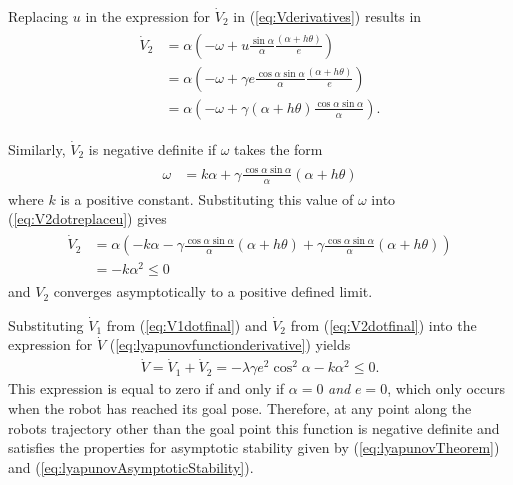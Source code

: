 Replacing $u$ in the expression for $\dot{V}_2$ in (\ref{eq:Vderivatives}) results in
\begin{align}
\label{eq:V2dotreplaceu}
\begin{split}
\dot{V}_2 &= \alpha\left(-\omega+u\frac{\sin\alpha}{\alpha}\frac{(\alpha+h\theta)}{e}\right) \\
&= \alpha\left(-\omega+\gamma e\frac{\cos\alpha\sin\alpha}{\alpha}\frac{(\alpha+h\theta)}{e}\right) \\
&= \alpha\left(-\omega+\gamma(\alpha+h\theta)\frac{\cos\alpha\sin\alpha}{\alpha}\right).
\end{split}
\end{align}

Similarly, $\dot{V}_2$ is negative definite if $\omega$ takes the form
\begin{align}
\label{eq:lyapunovomega}
\begin{split}
\omega &= k\alpha + \gamma\frac{\cos\alpha\sin\alpha}{\alpha}\left(\alpha+h\theta\right)
\end{split}
\end{align}
where $k$ is a positive constant. Substituting this value of $\omega$ into (\ref{eq:V2dotreplaceu}) gives
\begin{align}
\label{eq:V2dotfinal}
\begin{split}
\dot{V}_2 &= \alpha\left(-k\alpha-\gamma\frac{\cos\alpha\sin\alpha}{\alpha}(\alpha+h\theta) + \gamma\frac{\cos\alpha\sin\alpha}{\alpha}(\alpha+h\theta)\right) \\
&= -k\alpha^2 \leq 0
\end{split}
\end{align}
and $V_2$ converges asymptotically to a positive defined limit.

Substituting $\dot{V}_1$ from (\ref{eq:V1dotfinal}) and $\dot{V}_2$ from (\ref{eq:V2dotfinal}) into the expression for $\dot{V}$ (\ref{eq:lyapunovfunctionderivative}) yields
\begin{align*}
\dot{V} = \dot{V}_1 + \dot{V}_2 = -\lambda\gamma e^2\cos^2\alpha - k\alpha^2 \leq 0.
\end{align*}
This expression is equal to zero if and only if $\alpha=0$ \textit{and} $e=0$, which only occurs when the robot has reached its goal pose. Therefore, at any point along the robots trajectory other than the goal point this function is negative definite and satisfies the properties for asymptotic stability given by (\ref{eq:lyapunovTheorem}) and (\ref{eq:lyapunovAsymptoticStability}).

